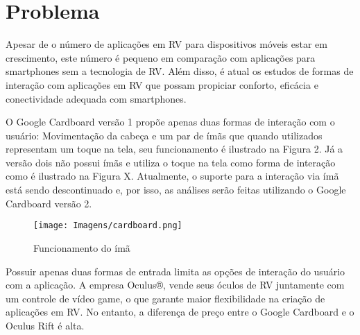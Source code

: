 \section{Problema}
\label{c.problema}

Apesar de o número de aplicações em RV para dispositivos móveis estar em crescimento, este número é pequeno em comparação com aplicações para smartphones sem a tecnologia de RV. Além disso, é atual os estudos de formas de interação com aplicações em RV que possam propiciar conforto, eficácia e conectividade adequada com smartphones. 

O Google Cardboard versão 1 propõe apenas duas formas de interação com o usuário: Movimentação da cabeça e um par de ímãs que quando utilizados representam um toque na tela, seu funcionamento é ilustrado na Figura 2. Já a versão dois não possui ímãs e utiliza o toque na tela como forma de interação como é ilustrado na Figura X. Atualmente, o suporte para a interação via ímã está sendo descontinuado e, por isso, as análises serão feitas utilizando o Google Cardboard versão 2.

\begin{figure}[h]
	\caption{\small Funcionamento do ímã}
	\centering
	\texttt{[image: Imagens/cardboard.png]}
	\label{f.cardboard1}
\end{figure}

Possuir apenas duas formas de entrada limita as opções de interação do usuário com a aplicação. A empresa Oculus®, vende seus óculos de RV juntamente com um controle de vídeo game, o que garante maior flexibilidade na criação de aplicações em RV. No entanto, a diferença de preço entre o Google Cardboard e o Oculus Rift é alta. 



